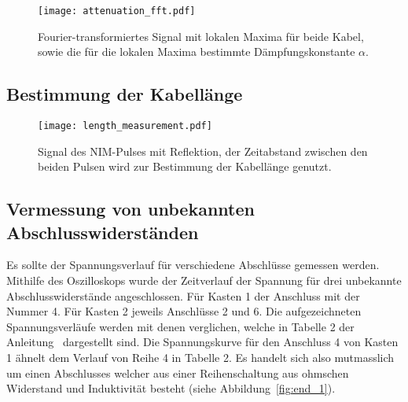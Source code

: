 \begin{figure}
  \centering
  \texttt{[image: attenuation\_fft.pdf]}
  \caption{%
    Fourier-transformiertes Signal mit lokalen Maxima für beide Kabel, sowie die für die lokalen Maxima bestimmte Dämpfungskonstante $α$.
  }\label{fig:attenuation_fft}
\end{figure}

\subsection{Bestimmung der Kabellänge}

\begin{figure}
  \centering
  \texttt{[image: length\_measurement.pdf]}
  \caption{%
    Signal des NIM-Pulses mit Reflektion, der Zeitabstand zwischen den beiden Pulsen wird zur Bestimmung der Kabellänge genutzt.
  }\label{fig:length}
\end{figure}

\begin{table}
  \centering
  \caption{%
    Laufzeitunterschied $\increment t$ und
    Kabellänge $l$ für die drei untersuchten Kabel
  }\label{tab:label}
  
\end{table}

\subsection{Vermessung von unbekannten Abschlusswiderständen}
Es sollte der Spannungsverlauf für verschiedene Abschlüsse gemessen werden. Mithilfe des Oszilloskops wurde der Zeitverlauf der Spannung für
drei unbekannte Abschlusswiderstände angeschlossen. Für Kasten 1 der Anschluss mit der Nummer 4. Für Kasten 2 jeweils Anschlüsse 2 und 6.
Die aufgezeichneten Spannungsverläufe werden mit denen verglichen, welche in Tabelle 2 der Anleitung~\cite{anleitung} dargestellt sind.
Die Spannungskurve für den Anschluss 4 von Kasten 1 ähnelt dem Verlauf von Reihe 4 in Tabelle 2.
Es handelt sich also mutmasslich um einen Abschlusses welcher aus einer Reihenschaltung aus ohmschen Widerstand und Induktivität besteht (siehe
Abbildung~\ref{fig:end_1}).

